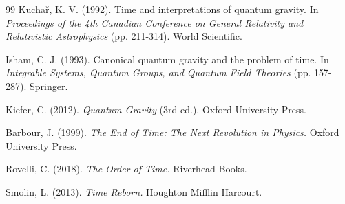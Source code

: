 \documentclass[12pt, a4paper]{article}
\begin{document}
\begin{thebibliography}{99}
Kucha\v{r}, K. V. (1992). Time and interpretations of quantum gravity. In \textit{Proceedings of the 4th Canadian Conference on General Relativity and Relativistic Astrophysics} (pp. 211-314). World Scientific.

Isham, C. J. (1993). Canonical quantum gravity and the problem of time. In \textit{Integrable Systems, Quantum Groups, and Quantum Field Theories} (pp. 157-287). Springer.

Kiefer, C. (2012). \textit{Quantum Gravity} (3rd ed.). Oxford University Press.

Barbour, J. (1999). \textit{The End of Time: The Next Revolution in Physics.} Oxford University Press.

Rovelli, C. (2018). \textit{The Order of Time.} Riverhead Books.

Smolin, L. (2013). \textit{Time Reborn.} Houghton Mifflin Harcourt.

\end{thebibliography}
\end{document}
